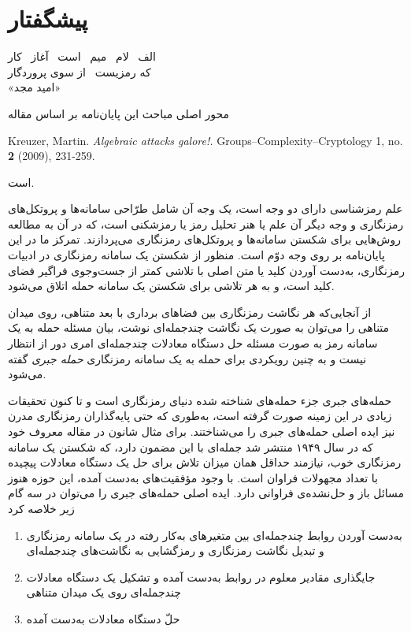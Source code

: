 \chapter*{ \textbf{\LARGE{پیشگفتار}}}
\renewcommand{\baselinestretch}{1.4}
\begin{flushleft}
{
 \small{
 الف  \ لام \  میم \  است  \ آغاز  \ کار\\
 که  رمزیست \  از سوی پروردگار\\
«امید مجد»
}}
\end{flushleft}
محور اصلی مباحث این پایان‌نامه بر اساس مقاله‌
\begin{latin}
\noindent
Kreuzer, Martin. {\em Algebraic attacks galore!.} Groups–Complexity–Cryptology 1, no. \textbf{2} (2009), 231-259.
\end{latin}
\vspace{-4mm}
\noindent است. 

علم رمزشناسی
دارای دو وجه است، یک وجه آن شامل طرّاحی سامانه‌ها و پروتکل‌های رمزنگاری و وجه دیگر آن علم یا هنر تحلیل رمز
یا رمزشکنی است، که در آن به مطالعه روش‌هایی برای  شکستن سامانه‌ها و پروتکل‌های رمزنگاری  می‌پردازند.  تمرکز ما در این پایان‌نامه بر روی وجه دوّم است. منظور از شکستن یک سامانه رمزنگاری در ادبیات رمزنگاری، به‌دست آوردن کلید یا متن اصلی با تلاشی کمتر از جست‌و‌جوی فراگیر فضای کلید است، و  به هر تلاشی برای شکستن یک سامانه حمله اتلاق می‌شود. 

از آنجایی‌که هر نگاشت رمزنگاری بین فضاهای برداری با بعد متناهی، روی میدان‌ متناهی را می‌توان به صورت یک نگاشت چند‌جمله‌ای نوشت، بیان مسئله‌  حمله به یک سامانه رمز به صورت مسئله‌  حل دستگاه معادلات  چندجمله‌ای امری دور از انتظار نیست و به چنین رویکردی برای حمله به یک سامانه رمزنگاری 
\textit{حمله  جبری }
گفته می‌شود.

حمله‌های جبری جزء حمله‌های شناخته شده دنیای رمزنگاری است و  تا کنون تحقیقات زیادی  در این زمینه صورت گرفته  است، به‌طوری  که حتی پایه‌گذاران رمزنگاری مدرن نیز ایده‌ اصلی حمله‌های جبری را می‌شناختند. برای مثال شانون در مقاله‌  معروف خود 
\cite{shannon1949communication}
که در سال ۱۹۴۹ منتشر شد جمله‌ای با این مضمون دارد، که شکستن یک سامانه‌ رمزنگاری خوب، نیازمند حداقل همان میزان تلاش برای حل یک دستگاه معادلات پیچیده با تعداد مجهولات فراوان است. با وجود مؤفقیت‌های به‌دست آمده، این حوزه هنوز مسائل باز و حل‌نشده‌ی فراوانی دارد. ایده‌ اصلی حمله‌های جبری را می‌توان در سه گام زیر خلاصه کرد
\begin{enumerate}
	\item
	به‌دست آوردن روابط چند‌جمله‌ای بین متغیر‌های به‌کار رفته در یک سامانه‌ رمزنگاری و تبدیل نگاشت‌ رمزنگاری و رمزگشایی به نگاشت‌های چند‌جمله‌ای
	\item
	جایگذاری مقادیر معلوم در روابط به‌دست آمده و تشکیل یک دستگاه معادلات چندجمله‌ای روی یک میدان متناهی
	\item
	حلّ دستگاه معادلات به‌دست آمده
\end{enumerate}


